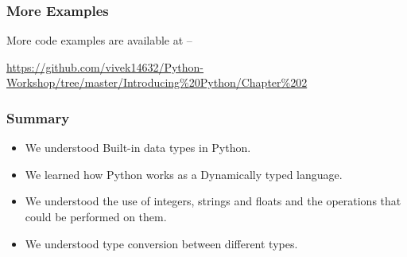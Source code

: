 \documentclass{beamer}
\begin{document}
\begin{frame}
\frametitle{More Examples}
More code examples are available at --
 
\url{https://github.com/vivek14632/Python-Workshop/tree/master/Introducing\%20Python/Chapter\%202}
\end{frame}


\begin{frame}
\frametitle{Summary}
\begin{itemize}
\item We understood Built-in data types in Python.
\item We learned how Python works as a Dynamically typed language.
\item We understood the use of integers, strings and floats and the operations that could be performed on them.
\item We understood type conversion between different types.
\end{itemize}
\end{frame}
\end{document}
